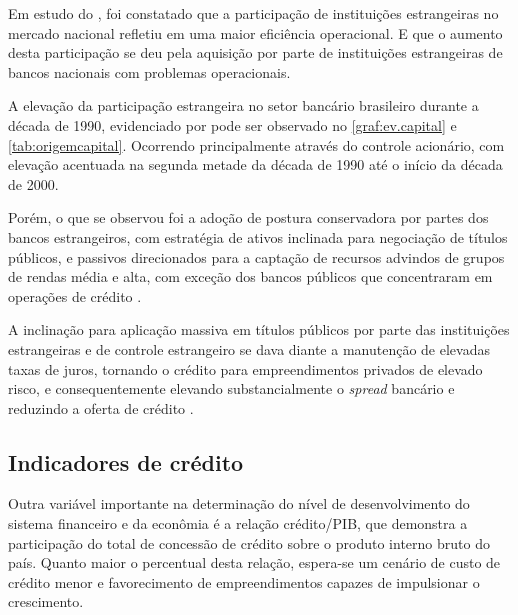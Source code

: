 \documentclass[
  12pt,
  12pt,
  openright,
  oneside,
  a4paper,
  chapter=TITLE,
  section=TITLE,
  subsection=TITLE,
  subsubsection=TITLE,
  portugues,
  sumario=tradicional]{abntex2}
\begin{document}
Em estudo do \textcite{BCB:1999}, foi constatado que a participação de instituições estrangeiras no mercado nacional refletiu em uma maior eficiência operacional. E que o aumento desta participação se deu pela aquisição por parte de instituições estrangeiras de bancos nacionais com problemas operacionais.

A elevação da participação estrangeira no setor bancário brasileiro durante a década de 1990, evidenciado por \textcite{camargo:2009} pode ser observado no \autoref{graf:ev.capital} e \autoref{tab:origemcapital}. Ocorrendo principalmente através do controle acionário, com elevação acentuada na segunda metade da década de 1990 até o início da década de 2000.

Porém, o que se observou foi a adoção de postura conservadora por partes dos bancos estrangeiros, com estratégia de ativos inclinada para negociação de títulos públicos, e passivos direcionados para a captação de recursos advindos de grupos de rendas média e alta, com exceção dos bancos públicos que concentraram em operações de crédito \cite{camargo:2009}.

A inclinação para aplicação massiva em títulos públicos por parte das instituições estrangeiras e de controle estrangeiro se dava diante a manutenção de elevadas taxas de juros, tornando o crédito para empreendimentos privados de elevado risco, e consequentemente elevando substancialmente o \emph{spread} bancário e reduzindo a oferta de crédito \cite{camargo:2009}.

\subsection{Indicadores de crédito}

Outra variável importante na determinação do nível de desenvolvimento do sistema financeiro e da econômia é a relação crédito/PIB, que demonstra a participação do total de concessão de crédito sobre o produto interno bruto do país. Quanto maior o percentual desta relação, espera-se um cenário de custo de crédito menor e favorecimento de empreendimentos capazes de impulsionar o crescimento.
\end{document}
